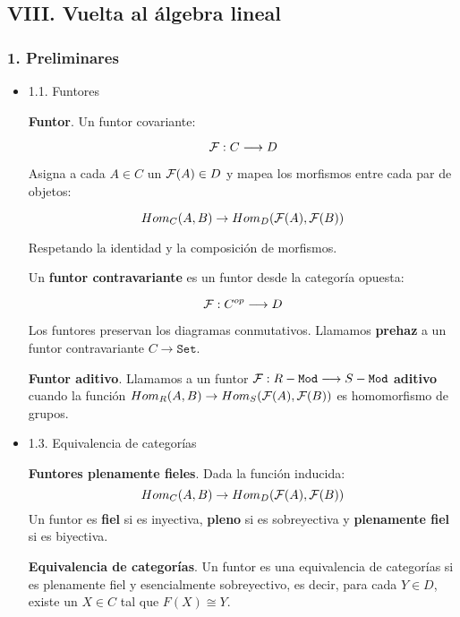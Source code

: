 \documentclass[11pt]{article}
\begin{document}
\subsection*{VIII. Vuelta al álgebra lineal}
\label{sec-4-4}
\subsubsection*{1. Preliminares}
\label{sec-4-4-1}
\begin{itemize}
\item 1.1. Funtores
\label{sec-4-4-1-1}
\begin{definition}
\textbf{Funtor}. Un funtor covariante:

\[{\cal F} : C \longrightarrow D\]

Asigna a cada $A \in C$ un ${\cal F}(A) \in D$ y mapea los morfismos entre cada par de objetos:

\[Hom_C(A,B) \rightarrow Hom_D({\cal F}(A),{\cal F}(B))\]

Respetando la identidad y la composición de morfismos. 

Un \textbf{funtor contravariante} es un funtor desde la categoría opuesta:

\[{\cal F} : C^{op} \longrightarrow D\]
\end{definition}

Los funtores preservan los diagramas conmutativos. Llamamos \textbf{prehaz} a un funtor
contravariante $C \longrightarrow \mathtt{Set}$.

\begin{definition}
\textbf{Funtor aditivo}. Llamamos a un funtor 
${\cal F}: R-\mathtt{Mod} \longrightarrow S-\mathtt{Mod}$ \textbf{aditivo} cuando
la función $Hom_{R}(A,B) \rightarrow Hom_{S}({\cal F}(A),{\cal F}(B))$ es homomorfismo de grupos.
\end{definition}

\item 1.3. Equivalencia de categorías
\label{sec-4-4-1-2}
\begin{definition}
\textbf{Funtores plenamente fieles}. Dada la función inducida:
\[Hom_C(A,B) \rightarrow Hom_D({\cal F}(A),{\cal F}(B))\]
Un funtor es \textbf{fiel} si es inyectiva, \textbf{pleno} si es sobreyectiva y \textbf{plenamente fiel}
si es biyectiva.
\end{definition}

\begin{definition}
\textbf{Equivalencia de categorías}. Un funtor es una equivalencia de categorías si 
es plenamente fiel y esencialmente sobreyectivo, es decir, para cada $Y \in D$,
existe un $X \in C$ tal que $F(X) \cong Y$.
\end{definition}


\end{itemize}
\end{document}
